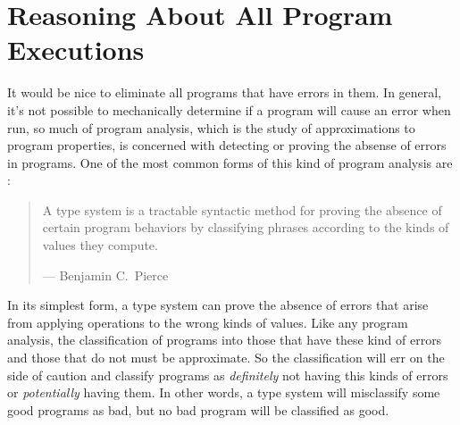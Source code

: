 \newcommand\typevaljudge[3]{{#1}\vdash{#2}:{#3}}
\newcommand\mtype{t}
\newcommand\typeof{\mathit{typeof}}
\newcommand\treduce{\mathbf{t}}
\newcommand\mtans{ta}
\newcommand\Ans{\mathit{Ans}}
\newcommand\TyAns{\mathit{TyAns}}

\newcommand\meint{i^\dagger}
\newcommand\moeint{j^\dagger}
\newcommand\mintv{\vec\mint}
\newcommand\mointv{\vec\moint}

\newcommand\BI{\mathcal{BI}}
\newcommand\ireduce{\mathbf{i}}
\newcommand\sreduce{\mathbf{s}}
\newcommand\intvdiv{\mathop\backslash}

\newcommand\mpath{\phi}
\newcommand\mcon{c}
\newcommand\msval{sv}
\newcommand\mcset{\mathcal{T}}
\newcommand\mtcons{tc}

\newcommand\allows[2][\mpath]{#1\models #2}

\section{Reasoning About All Program Executions} %

It would be nice to eliminate all programs that have errors in them.
In general, it's not possible to mechanically determine if a program
will cause an error when run, so much of program analysis, which is
the study of approximations to program properties, is concerned with
detecting or proving the absense of errors in programs.  One of the
most common forms of this kind of program analysis are :

\begin{quotation}
A type system is a tractable syntactic method for proving the absence
of certain program behaviors by classifying phrases according to the
kinds of values they compute.

\raggedleft --- Benjamin C.~Pierce
\end{quotation}

In its simplest form, a type system can prove the absence of errors
that arise from applying operations to the wrong kinds of values.  Like
any program analysis, the classification of programs into those that
have these kind of errors and those that do not must be approximate.
So the classification will err on the side of caution and classify
programs as \emph{definitely} not having this kinds of errors or
\emph{potentially} having them.  In other words, a type system will
misclassify some good programs as bad, but no bad program will be
classified as good.


